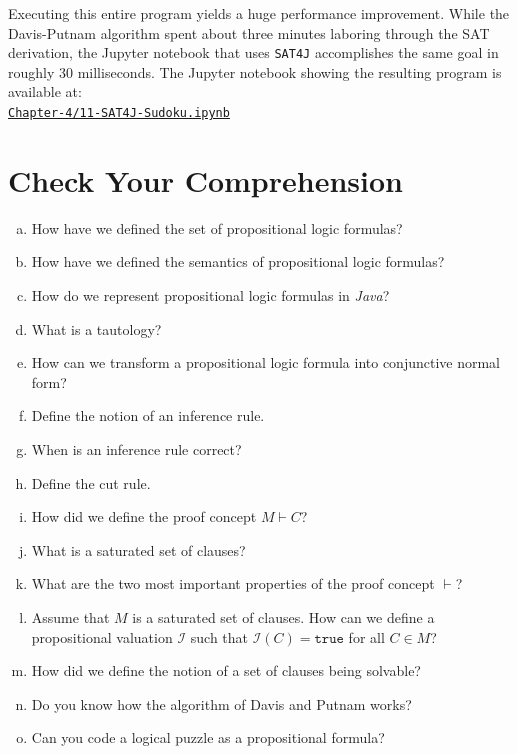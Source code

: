 Executing this entire program yields a huge performance improvement.  While the Davis-Putnam
algorithm spent about three minutes laboring through the SAT derivation, the Jupyter notebook that uses
\texttt{SAT4J} accomplishes the same goal in roughly 30 milliseconds.  
The Jupyter notebook showing the resulting program is available at:
\\[0.2cm]
\hspace*{1.3cm}
\href{https://github.com/karlstroetmann/Logic/blob/master/Java/Chapter-4/11-SAT4J-Sudoku.ipynb}{\texttt{Chapter-4/11-SAT4J-Sudoku.ipynb}}
\pagebreak

\vspace*{\fill}
\pagebreak

\section{Check Your Comprehension}
\begin{enumerate}[(a)]
\item How have we defined the set of propositional logic formulas?
\item How have we defined the semantics of propositional logic formulas?
\item How do we represent propositional logic formulas in \textsl{Java}?
\item What is a tautology?
\item How can we transform a propositional logic formula into conjunctive normal
      form?
\item Define the notion of an inference rule.
\item When is an inference rule correct?
\item Define the cut rule.
\item How did we define the proof concept $M \vdash C$?
\item What is a saturated set of clauses?
\item What are the two most important properties of the proof concept $\vdash$?
\item Assume that $M$ is a saturated set of clauses. How can we define a propositional valuation
      $\mathcal{I}$ such that $\mathcal{I}(C) = \mathtt{true}$ for all $C \in M$?
\item How did we define the notion of a set of clauses being solvable?
\item Do you know how the algorithm of Davis and Putnam works?
\item Can you code a logical puzzle as a propositional formula?
\end{enumerate}


%

